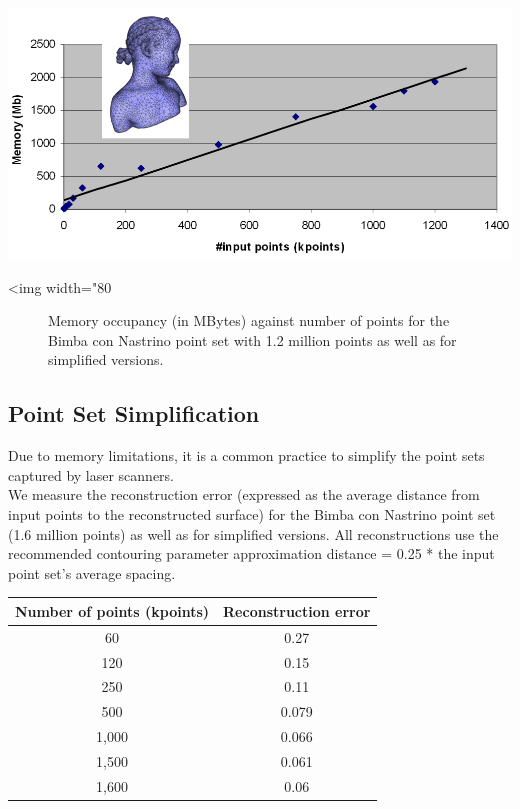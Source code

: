 \begin{center}
    \label{Surface_reconstruction_points_3-fig-memory_bench}
    \begin{ccTexOnly}
      \includegraphics[width=1.0\textwidth]{Surface_reconstruction_points_3/memory_bench}
    \end{ccTexOnly}
    \begin{ccHtmlOnly}
        <img width="80%
    \end{ccHtmlOnly}
    \begin{figure}[h]
        \caption{Memory occupancy (in MBytes) against number of points
                 for the Bimba con Nastrino point set with 1.2 million points
                 as well as for simplified versions.}
    \end{figure}
\end{center}



\subsection{Point Set Simplification}

Due to memory limitations, it is a common practice to simplify the point sets captured by laser scanners.\\
We measure the reconstruction error (expressed as the average distance from input points to the reconstructed surface) for the Bimba con Nastrino point set (1.6 million points) as well as for simplified versions. All reconstructions use the recommended contouring parameter approximation distance = 0.25 * the input point set's average spacing.

\begin{tabular}{|c|c|}
  \hline
  Number of points (kpoints) & Reconstruction error \\
  \hline
  60                         & 0.27 \\
  120                        & 0.15 \\
  250                        & 0.11 \\
  500                        & 0.079 \\
  1,000                       & 0.066 \\
  1,500                       & 0.061 \\
  1,600                       & 0.06 \\
  \hline
\end{tabular}

